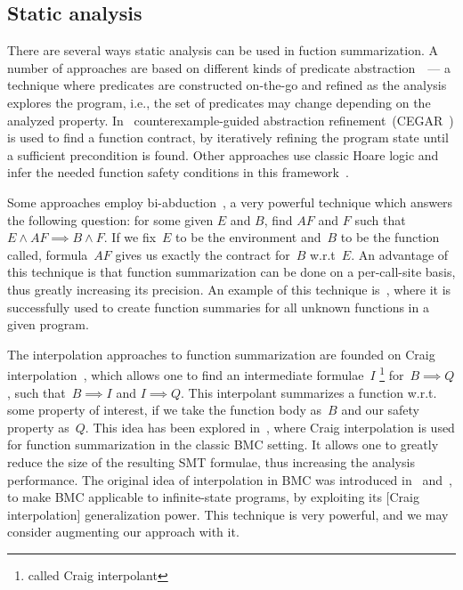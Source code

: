\subsection{Static analysis}

There are several ways static analysis can be used in fuction summarization. A number of approaches are based on different kinds of predicate abstraction~\cite{PredAbs}~--- a technique where predicates are constructed on-the-go and refined as the analysis explores the program, i.e., the set of predicates may change depending on the analyzed property. In~\cite{CegarPrecondition} counterexample-guided abstraction refinement~(CEGAR~\cite{CEGAR}) is used to find a function contract, by iteratively refining the program state until a sufficient precondition is found. Other approaches use classic Hoare logic and infer the needed function safety conditions in this framework~\cite{BarnettLeino}.

Some approaches employ bi-abduction~\cite{BiAbduction}, a very powerful technique which answers the following question: for some given $E$ and $B$, find $AF$ and $F$ such that $E \land AF \implies B \land F$. If we fix~$E$ to be the environment and~$B$ to be the function called, formula~$AF$ gives us exactly the contract for~$B$ w.r.t~$E$. An advantage of this technique is that function summarization can be done on a per-call-site basis, thus greatly increasing its precision. An example of this technique is~\cite{MaxSpecSynth}, where it is successfully used to create function summaries for all unknown functions in a given program.

The interpolation approaches to function summarization are founded on Craig interpolation~\cite{CraigInMC}, which allows one to find an intermediate formulae~$I$%
\footnote{called Craig interpolant}
for~$B \implies Q$, such that~$B \implies I$ and $I \implies Q$. This interpolant summarizes a function w.r.t. some property of interest, if we take the function body as~$B$ and our safety property as~$Q$. This idea has been explored in~\cite{FunSum}, where Craig interpolation is used for function summarization in the classic BMC setting. It allows one to greatly reduce the size of the resulting SMT formulae, thus increasing the analysis performance. The original idea of interpolation in BMC was introduced in~\cite{CraigInMC} and~\cite{LazyAbs}, to make BMC applicable to infinite-state programs, by exploiting its [Craig interpolation] generalization power. This technique is very powerful, and we may consider augmenting our approach with it.
